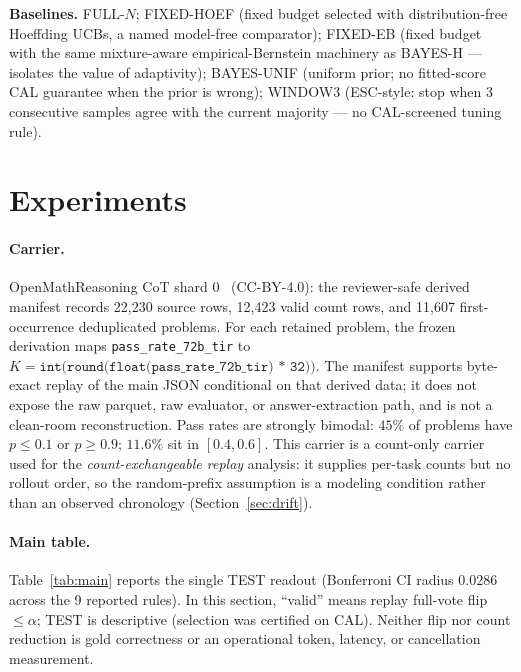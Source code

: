 \documentclass{article}
\theoremstyle{definition}
\theoremstyle{remark}
\begin{document}
\textbf{Baselines.} FULL-$N$; FIXED-HOEF (fixed budget selected with
distribution-free Hoeffding UCBs, a named model-free comparator);
FIXED-EB (fixed budget with the same mixture-aware empirical-Bernstein
machinery as BAYES-H --- isolates the value of adaptivity);
BAYES-UNIF (uniform prior; no fitted-score CAL guarantee when the prior is wrong);
WINDOW3 (ESC-style: stop when 3 consecutive samples agree with the current
majority --- no CAL-screened tuning rule).

\section{Experiments}
\label{sec:experiments}

\paragraph{Carrier.} OpenMathReasoning CoT shard 0~\citep{moshkov2025openmathreasoning} (CC-BY-4.0): the
reviewer-safe derived manifest records 22{,}230 source rows, 12{,}423 valid
count rows, and 11{,}607 first-occurrence deduplicated problems. For each
retained problem, the frozen derivation maps \texttt{pass\_rate\_72b\_tir} to
$K=\texttt{int(round(float(pass\_rate\_72b\_tir) * 32))}$. The manifest
supports byte-exact replay of the main JSON conditional on that derived data;
it does not expose the raw parquet, raw evaluator, or answer-extraction path,
and is not a clean-room reconstruction. Pass rates are strongly bimodal: $45\%$ of problems
have $p\le0.1$ or $p\ge0.9$; $11.6\%$ sit in $[0.4,0.6]$. This carrier is a
count-only carrier used for the \emph{count-exchangeable replay} analysis:
it supplies per-task counts but no rollout order, so the random-prefix
assumption is a modeling condition rather than an observed chronology
(Section~\ref{sec:drift}).

\paragraph{Main table.} Table~\ref{tab:main} reports the single TEST readout
(Bonferroni CI radius $0.0286$ across the 9 reported rules). In this section,
``valid'' means replay full-vote flip $\le\alpha$; TEST is descriptive
(selection was certified on CAL). Neither flip nor count reduction is gold
correctness or an operational token, latency, or cancellation measurement.
\end{document}
